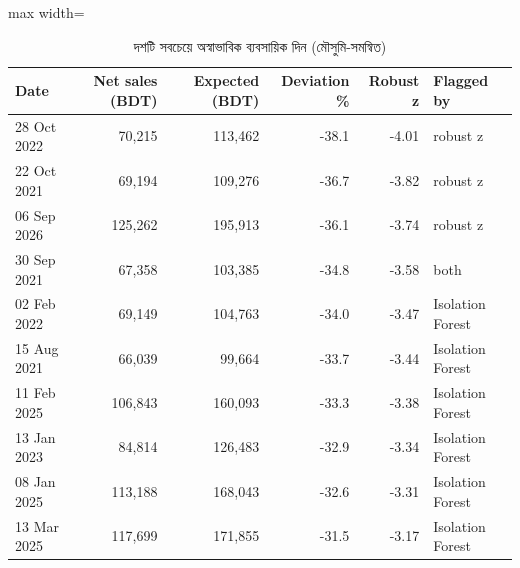 \begin{table}[htbp]
\centering
\small
\caption{দশটি সবচেয়ে অস্বাভাবিক ব্যবসায়িক দিন (মৌসুমি-সমন্বিত)}
\label{tab:dailyanom}
\begin{adjustbox}{max width=\linewidth}
\begin{tabular}{lrrrrl}
\toprule
\textbf{Date} & \textbf{Net sales (BDT)} & \textbf{Expected (BDT)} & \textbf{Deviation \%} & \textbf{Robust z} & \textbf{Flagged by} \\
\midrule
28 Oct 2022 & 70,215 & 113,462 & -38.1 & -4.01 & robust z \\
22 Oct 2021 & 69,194 & 109,276 & -36.7 & -3.82 & robust z \\
06 Sep 2026 & 125,262 & 195,913 & -36.1 & -3.74 & robust z \\
30 Sep 2021 & 67,358 & 103,385 & -34.8 & -3.58 & both \\
02 Feb 2022 & 69,149 & 104,763 & -34.0 & -3.47 & Isolation Forest \\
15 Aug 2021 & 66,039 & 99,664 & -33.7 & -3.44 & Isolation Forest \\
11 Feb 2025 & 106,843 & 160,093 & -33.3 & -3.38 & Isolation Forest \\
13 Jan 2023 & 84,814 & 126,483 & -32.9 & -3.34 & Isolation Forest \\
08 Jan 2025 & 113,188 & 168,043 & -32.6 & -3.31 & Isolation Forest \\
13 Mar 2025 & 117,699 & 171,855 & -31.5 & -3.17 & Isolation Forest \\
\bottomrule
\end{tabular}
\end{adjustbox}
\end{table}